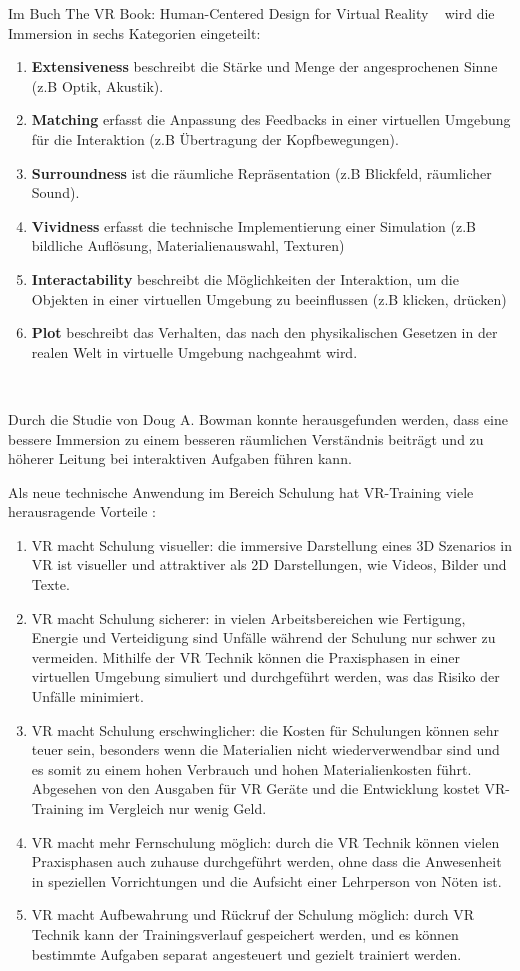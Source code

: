 Im Buch \glqq The VR Book: Human-Centered Design for Virtual Reality \grqq\ \citep{28} wird die Immersion in sechs Kategorien eingeteilt: 

\begin{enumerate}
\item \textbf{Extensiveness} beschreibt die Stärke und Menge der angesprochenen Sinne (z.B Optik, Akustik).
\item \textbf{Matching} erfasst die Anpassung des Feedbacks in einer virtuellen Umgebung für die Interaktion (z.B Übertragung der Kopfbewegungen).
\item \textbf{Surroundness} ist die räumliche Repräsentation (z.B Blickfeld, räumlicher Sound).
\item \textbf{Vividness} erfasst die technische Implementierung einer Simulation (z.B bildliche Auflösung, Materialienauswahl, Texturen)
\item \textbf{Interactability} beschreibt die Möglichkeiten der Interaktion, um die Objekten in einer virtuellen Umgebung zu beeinflussen (z.B klicken, drücken)
\item \textbf{Plot} beschreibt das Verhalten, das nach den physikalischen Gesetzen in der realen Welt in virtuelle Umgebung nachgeahmt wird.
\end{enumerate}\

Durch die Studie von Doug A. Bowman \citep{27} konnte herausgefunden werden, dass eine bessere Immersion zu einem besseren räumlichen Verständnis beiträgt und zu höherer Leitung bei interaktiven Aufgaben führen kann.

Als neue technische Anwendung im Bereich Schulung hat VR-Training viele herausragende Vorteile \citep{15}:

\begin{enumerate}
\item VR macht Schulung visueller: die immersive Darstellung eines 3D Szenarios in VR ist visueller und attraktiver als 2D Darstellungen, wie Videos, Bilder und Texte.
\item VR macht Schulung sicherer: in vielen Arbeitsbereichen wie Fertigung, Energie und Verteidigung sind Unfälle während der Schulung nur schwer zu vermeiden. Mithilfe der VR Technik können die Praxisphasen in einer virtuellen Umgebung simuliert und durchgeführt werden, was das Risiko der Unfälle minimiert.
\item VR macht Schulung erschwinglicher: die Kosten für Schulungen können sehr teuer sein, besonders wenn die Materialien nicht wiederverwendbar sind und es somit zu einem hohen Verbrauch und hohen Materialienkosten führt. Abgesehen von den Ausgaben für VR Geräte und die Entwicklung kostet VR-Training im Vergleich nur wenig Geld.
\item VR macht mehr Fernschulung möglich: durch die VR Technik können vielen Praxisphasen auch zuhause durchgeführt werden, ohne dass die Anwesenheit in speziellen Vorrichtungen und die Aufsicht einer Lehrperson von Nöten ist.
\item VR macht Aufbewahrung und Rückruf der Schulung möglich: durch VR Technik kann der Trainingsverlauf gespeichert werden, und es können bestimmte Aufgaben separat angesteuert und gezielt trainiert werden.
\end{enumerate}\


